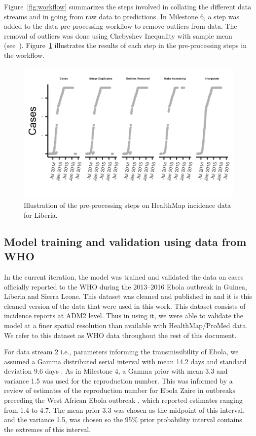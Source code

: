 \documentclass[11pt,]{article}
\begin{document}
Figure~\ref{fig:workflow} summarizes the steps involved in collating
the different data streams and in going from raw data to predictions. In Milestone 6, a step was added to the data pre-processing workflow
to remove outliers from data. The removal of outliers was done using Chebyshev Inequality
with sample mean (see~\citep{saw1984chebyshev}). Figure~\ref{fig:wf_example} illustrates
the results of each step in the pre-processing steps in the workflow.

\begin{figure}
  \centering
  \includegraphics[]{ms6-figures/liberia-preprocessing2}
  \caption{Illustration of the pre-processing steps on HealthMap incidence
    data for Liberia.}
  \label{fig:wf_example}
\end{figure}
\FloatBarrier

\subsection{Model training and validation using data from
WHO}\label{model-training-and-validation-using-data-from-who}

In the current iteration, the model was trained and validated the data
on cases officially reported to the WHO during the 2013--2016 Ebola
outbreak in Guinea, Liberia and Sierra Leone. This dataset was cleaned
and published in \citep{garske20160308} and it is this cleaned version
of the data that were used in this work. This dataset consists of
incidence reports at ADM2 level. Thus in using it, we were able to validate the model at a finer spatial resolution than available
with HealthMap/ProMed data. We refer to this dataset as WHO data
throughout the rest of this document.

For data stream 2 i.e., parameters informing the transmissibility of
Ebola, we assumed a Gamma distributed serial interval with mean 14.2
days and standard deviation 9.6 days \citep{team2015west}.
As in Milestone 4, a Gamma prior with mean 3.3 and variance 1.5 was
used for the reproduction number. This was informed by a review of estimates of the reproduction number for Ebola Zaire in outbreaks preceding the West African Ebola outbreak \citep{van2015review}, which reported estimates ranging from 1.4 to 4.7. The mean prior 3.3 was chosen as the midpoint of this interval, and the variance 1.5, was chosen so the 95\% prior probability interval contains the extremes of this interval.
\end{document}
